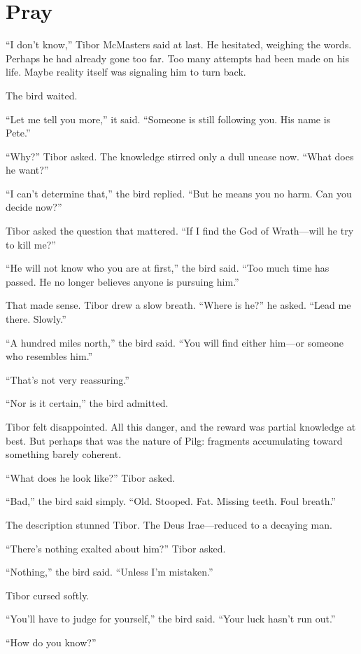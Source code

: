 \chapter{Pray}

“I don’t know,” Tibor McMasters said at last. He hesitated, weighing the words. Perhaps he had already gone too far. Too many attempts had been made on his life. Maybe reality itself was signaling him to turn back.

The bird waited.

“Let me tell you more,” it said. “Someone is still following you. His name is Pete.”

“Why?” Tibor asked. The knowledge stirred only a dull unease now. “What does he want?”

“I can’t determine that,” the bird replied. “But he means you no harm. Can you decide now?”

Tibor asked the question that mattered. “If I find the God of Wrath—will he try to kill me?”

“He will not know who you are at first,” the bird said. “Too much time has passed. He no longer believes anyone is pursuing him.”

That made sense. Tibor drew a slow breath. “Where is he?” he asked. “Lead me there. Slowly.”

“A hundred miles north,” the bird said. “You will find either him—or someone who resembles him.”

“That’s not very reassuring.”

“Nor is it certain,” the bird admitted.

Tibor felt disappointed. All this danger, and the reward was partial knowledge at best. But perhaps that was the nature of Pilg: fragments accumulating toward something barely coherent.

“What does he look like?” Tibor asked.

“Bad,” the bird said simply. “Old. Stooped. Fat. Missing teeth. Foul breath.”

The description stunned Tibor. The Deus Irae—reduced to a decaying man.

“There’s nothing exalted about him?” Tibor asked.

“Nothing,” the bird said. “Unless I’m mistaken.”

Tibor cursed softly.

“You’ll have to judge for yourself,” the bird said. “Your luck hasn’t run out.”

“How do you know?”


